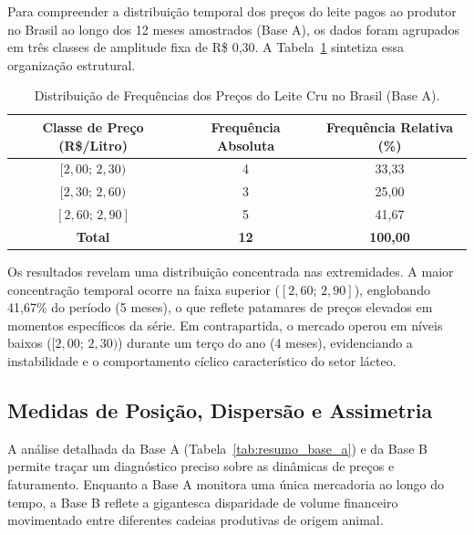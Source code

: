 \documentclass[12pt,a4paper]{article}
\begin{document}
Para compreender a distribuição temporal dos preços do leite pagos ao produtor no Brasil ao longo dos 12 meses amostrados (Base A), os dados foram agrupados em três classes de amplitude fixa de R\$ 0,30. A Tabela~\ref{tab:frequencias_leite} sintetiza essa organização estrutural.

\begin{table}[H]
\centering
\caption{Distribuição de Frequências dos Preços do Leite Cru no Brasil (Base A).}
\label{tab:frequencias_leite}
\begin{tabular}{ccc}
\toprule
\textbf{Classe de Preço (R\$/Litro)} & \textbf{Frequência Absoluta} & \textbf{Frequência Relativa (\%)} \\
\midrule
$[2,00;\, 2,30)$ & 4 & 33,33 \\
$[2,30;\, 2,60)$ & 3 & 25,00 \\
$[2,60;\, 2,90]$ & 5 & 41,67 \\
\midrule
\textbf{Total} & \textbf{12} & \textbf{100,00} \\
\bottomrule
\end{tabular}
\end{table}

Os resultados revelam uma distribuição concentrada nas extremidades. A maior concentração temporal ocorre na faixa superior ($[2,60;\, 2,90]$), englobando 41,67\% do período (5 meses), o que reflete patamares de preços elevados em momentos específicos da série. Em contrapartida, o mercado operou em níveis baixos ($[2,00;\, 2,30)$) durante um terço do ano (4 meses), evidenciando a instabilidade e o comportamento cíclico característico do setor lácteo.

\subsection{Medidas de Posição, Dispersão e Assimetria}

A análise detalhada da Base A (Tabela~\ref{tab:resumo_base_a}) e da Base B permite traçar um diagnóstico preciso sobre as dinâmicas de preços e faturamento. Enquanto a Base A monitora uma única mercadoria ao longo do tempo, a Base B reflete a gigantesca disparidade de volume financeiro movimentado entre diferentes cadeias produtivas de origem animal.

\begin{table}[H]
\centering
\caption{Medidas Descritivas dos Preços do Leite -- Brasil e Minas Gerais (Base A).}
\label{tab:resumo_base_a}
\end{table}
\end{document}
